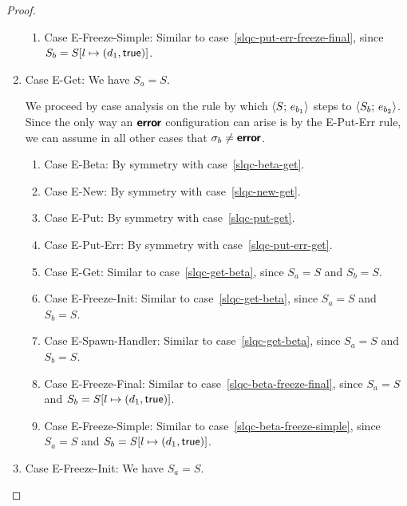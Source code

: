 \begin{proof}
\begin{enumerate}
\begin{enumerate}
    \item \label{slqc-put-err-freeze-simple}Case {\sc
      E-Freeze-Simple}: Similar to
      case~\ref{slqc-put-err-freeze-final}, since $S_b =
      S[l \mapsto (d_1, \textsf{true})]$.

    \end{enumerate}
  \item Case {\sc E-Get}: We have $S_a = S$.

    We proceed by case analysis on the rule by which
    $\langle S;\, e_{b_1} \rangle$ steps to $\langle S_b;\, e_{b_2} \rangle$.  Since the
    only way an $\textbf{\textsf{error}}$ configuration can arise is by the {\sc
      E-Put-Err} rule, we can assume in all other cases that $\sigma_b
    \neq \textbf{\textsf{error}}$.
    \begin{enumerate}
    \item \label{slqc-get-beta}Case {\sc E-Beta}: By symmetry with case~\ref{slqc-beta-get}.
    \item \label{slqc-get-new}Case {\sc E-New}: By symmetry with case~\ref{slqc-new-get}.
    \item \label{slqc-get-put}Case {\sc E-Put}: By symmetry with case~\ref{slqc-put-get}.
    \item \label{slqc-get-put-err}Case {\sc E-Put-Err}: By symmetry with case~\ref{slqc-put-err-get}.
    \item \label{slqc-get-get}Case {\sc E-Get}: Similar to
      case~\ref{slqc-get-beta}, since $S_a = S$ and $S_b = S$.
    \item \label{slqc-get-freeze-init}Case {\sc E-Freeze-Init}:
      Similar to case~\ref{slqc-get-beta}, since $S_a = S$ and $S_b = S$.
    \item \label{slqc-get-spawn-handler}Case {\sc E-Spawn-Handler}:
      Similar to case~\ref{slqc-get-beta}, since $S_a = S$ and $S_b = S$.
    \item \label{slqc-get-freeze-final}Case {\sc E-Freeze-Final}:
      Similar to case~\ref{slqc-beta-freeze-final}, since $S_a = S$
      and $S_b = S[l \mapsto (d_1, \textsf{true})]$.
    \item \label{slqc-get-freeze-simple}Case {\sc E-Freeze-Simple}:
      Similar to case~\ref{slqc-beta-freeze-simple}, since $S_a = S$
      and $S_b = S[l \mapsto (d_1, \textsf{true})]$.
    \end{enumerate}

  \item Case {\sc E-Freeze-Init}: We have $S_a = S$.


\end{enumerate}
\end{proof}
